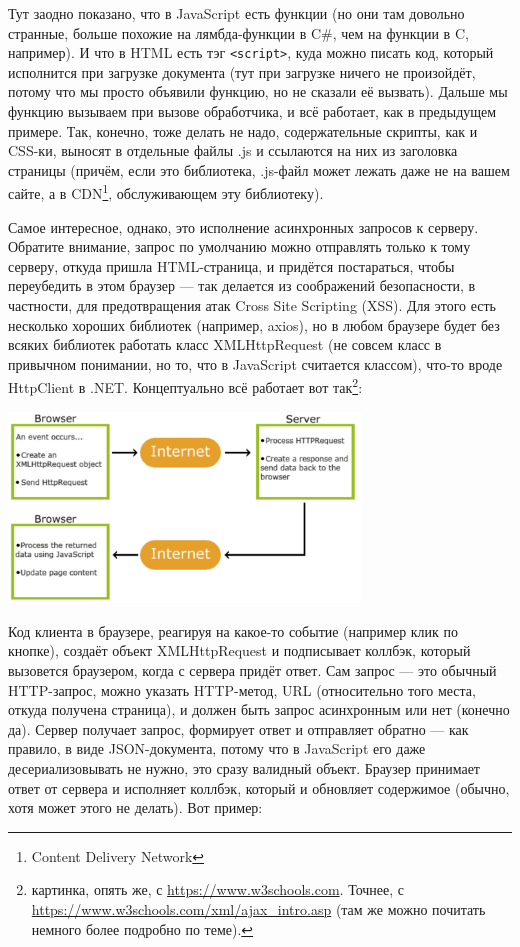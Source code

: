 \documentclass[a5paper]{article}
\begin{document}
Тут заодно показано, что в JavaScript есть функции (но они там довольно странные, больше похожие на лямбда-функции в C\#, чем на функции в C, например). И что в HTML есть тэг \texttt{<script>}, куда можно писать код, который исполнится при загрузке документа (тут при загрузке ничего не произойдёт, потому что мы просто объявили функцию, но не сказали её вызвать). Дальше мы функцию вызываем при вызове обработчика, и всё работает, как в предыдущем примере. Так, конечно, тоже делать не надо, содержательные скрипты, как и CSS-ки, выносят в отдельные файлы .js и ссылаются на них из заголовка страницы (причём, если это библиотека, .js-файл может лежать даже не на вашем сайте, а в CDN\footnote{Content Delivery Network}, обслуживающем эту библиотеку).

Самое интересное, однако, это исполнение асинхронных запросов к серверу. Обратите внимание, запрос по умолчанию можно отправлять только к тому серверу, откуда пришла HTML-страница, и придётся постараться, чтобы переубедить в этом браузер --- так делается из соображений безопасности, в частности, для предотвращения атак Cross Site Scripting (XSS). Для этого есть несколько хороших библиотек (например, axios), но в любом браузере будет без всяких библиотек работать класс XMLHttpRequest (не совсем класс в привычном понимании, но то, что в JavaScript считается классом), что-то вроде HttpClient в .NET. Концептуально всё работает вот так\footnote{картинка, опять же, с \url{https://www.w3schools.com}. Точнее, с \url{https://www.w3schools.com/xml/ajax_intro.asp} (там же можно почитать немного более подробно по теме).}:

\begin{center}
    \includegraphics[width=0.7\textwidth]{ajax.png}
\end{center}

Код клиента в браузере, реагируя на какое-то событие (например клик по кнопке), создаёт объект XMLHttpRequest и подписывает коллбэк, который вызовется браузером, когда с сервера придёт ответ. Сам запрос --- это обычный HTTP-запрос, можно указать HTTP-метод, URL (относительно того места, откуда получена страница), и должен быть запрос асинхронным или нет (конечно да). Сервер получает запрос, формирует ответ и отправляет обратно --- как правило, в виде JSON-документа, потому что в JavaScript его даже десериализовывать не нужно, это сразу валидный объект. Браузер принимает ответ от сервера и исполняет коллбэк, который и обновляет содержимое (обычно, хотя может этого не делать). Вот пример:
\end{document}
